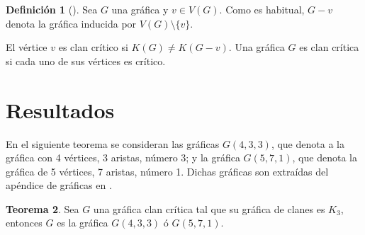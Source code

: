 \documentclass[12pt]{book}
\theoremstyle{definition}
\newtheorem{theorem}{Teorema}[chapter]
\newtheorem{definition}[theorem]{Definición}
\begin{document}
\begin{definition}[\citealt{Alcon:2006}]
Sea $G$ una gráfica y $v \in V(G)$. Como es habitual, $G-v$ denota la gráfica inducida por $V(G)\setminus \{v\}$.  

El vértice $v$ es clan crítico si $K(G)\neq K(G-v)$. Una gráfica $G$ es clan crítica si cada uno de sus vértices es crítico.
\end{definition}



\section*{Resultados}

En el siguiente teorema se consideran las gráficas $G(4,3,3)$, que denota a la gráfica con 4 vértices, 3 aristas, número 3; y la gráfica $G(5,7,1)$, que denota la gráfica de 5 vértices, 7 aristas, número 1. Dichas gráficas son extraídas del apéndice de gráficas en \cite{Harary:1969}.
\begin{theorem}
	Sea $G$ una gráfica clan crítica tal que su gráfica de clanes es $K_3$, entonces $G$ es la gráfica $G(4,3,3)$ ó $G(5,7,1)$.
\end{theorem}
\end{document}
